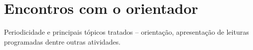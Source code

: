\chapter{Encontros com o orientador}\label{ch:introducao}
Periodicidade e principais tópicos tratados – orientação, apresentação de leituras programadas dentre outras atividades.